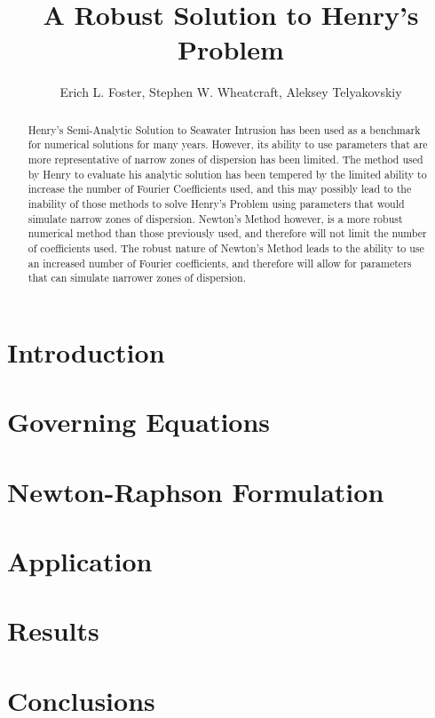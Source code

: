 \documentclass{article}
\title{A Robust Solution to Henry's Problem}
\author{Erich L. Foster, Stephen W. Wheatcraft, Aleksey Telyakovskiy}
\begin{document}
\maketitle

\begin{abstract}
Henry's Semi-Analytic Solution to Seawater Intrusion has been used as a 
benchmark for numerical solutions for many years. However, its ability to use 
parameters that are more representative of narrow zones of dispersion has been 
limited. The method used by Henry to evaluate his analytic solution has been 
tempered by the limited ability to increase the number of Fourier Coefficients 
used, and this may possibly lead to the inability of those methods to solve 
Henry's Problem using parameters that would simulate narrow zones of dispersion. 
Newton's Method however, is a more robust numerical method than those previously 
used, and therefore will not limit the number of coefficients used. The robust 
nature of Newton's Method leads to the ability to use an increased number of 
Fourier coefficients, and therefore will allow for parameters that can simulate 
narrower zones of dispersion.
\end{abstract}



\section{Introduction}


\section{Governing Equations}


%

\section{Newton-Raphson Formulation}


\section{Application}


\section{Results}


\section{Conclusions}




\end{document}
